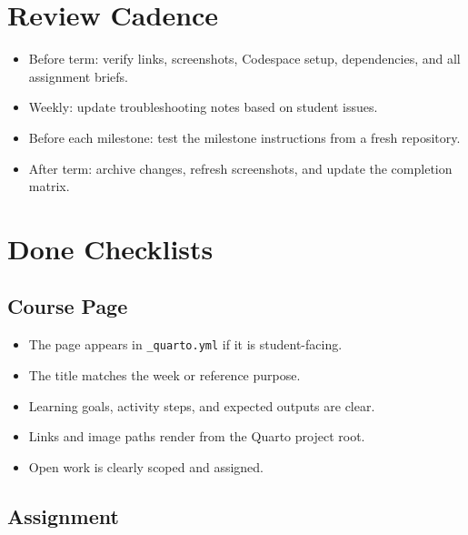 \documentclass[
  letterpaper,
  DIV=11,
  numbers=noendperiod,
  oneside]{scrreprt}
\providecommand{\tightlist}{%
  \setlength{\itemsep}{0pt}\setlength{\parskip}{0pt}}
\begin{document}
\section*{Review Cadence}\label{review-cadence}


\begin{itemize}
\tightlist
\item
  Before term: verify links, screenshots, Codespace setup, dependencies,
  and all assignment briefs.
\item
  Weekly: update troubleshooting notes based on student issues.
\item
  Before each milestone: test the milestone instructions from a fresh
  repository.
\item
  After term: archive changes, refresh screenshots, and update the
  completion matrix.
\end{itemize}

\section*{Done Checklists}\label{done-checklists}


\subsection*{Course Page}\label{course-page}

\begin{itemize}
\tightlist
\item
  The page appears in \texttt{\_quarto.yml} if it is student-facing.
\item
  The title matches the week or reference purpose.
\item
  Learning goals, activity steps, and expected outputs are clear.
\item
  Links and image paths render from the Quarto project root.
\item
  Open work is clearly scoped and assigned.
\end{itemize}

\subsection*{Assignment}\label{assignment}
\end{document}
